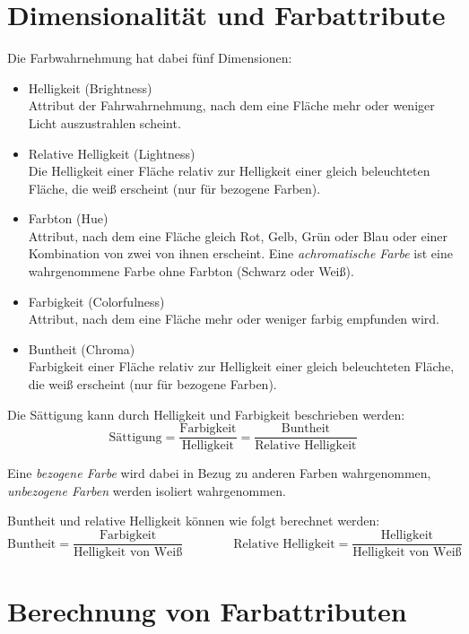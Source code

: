 	\section{Dimensionalität und Farbattribute}
		Die Farbwahrnehmung hat dabei fünf Dimensionen:
		\begin{itemize}
			\item Helligkeit (Brightness) \\ Attribut der Fahrwahrnehmung, nach dem eine Fläche mehr oder weniger Licht auszustrahlen scheint.
			\item Relative Helligkeit (Lightness) \\ Die Helligkeit einer Fläche relativ zur Helligkeit einer gleich beleuchteten Fläche, die weiß erscheint (nur für bezogene Farben).
			\item Farbton (Hue) \\ Attribut, nach dem eine Fläche gleich Rot, Gelb, Grün oder Blau oder einer Kombination von zwei von ihnen erscheint. Eine \emph{achromatische Farbe} ist eine wahrgenommene Farbe ohne Farbton (\zB Schwarz oder Weiß).
			\item Farbigkeit (Colorfulness) \\ Attribut, nach dem eine Fläche mehr oder weniger farbig empfunden wird.
			\item Buntheit (Chroma) \\ Farbigkeit einer Fläche relativ zur Helligkeit einer gleich beleuchteten Fläche, die weiß erscheint (nur für bezogene Farben).
		\end{itemize}
		Die Sättigung kann durch Helligkeit und Farbigkeit beschrieben werden:
		\begin{equation*}
			\text{Sättigung} = \frac{\text{Farbigkeit}}{\text{Helligkeit}} = \frac{\text{Buntheit}}{\text{Relative Helligkeit}}
		\end{equation*}
		
		Eine \emph{bezogene Farbe} wird dabei in Bezug zu anderen Farben wahrgenommen, \emph{unbezogene Farben} werden isoliert wahrgenommen.
		
		Buntheit und relative Helligkeit können wie folgt berechnet werden:
		\begin{equation*}
			\text{Buntheit} = \frac{\text{Farbigkeit}}{\text{Helligkeit von Weiß}} \quad\quad\quad\quad \text{Relative Helligkeit} = \frac{\text{Helligkeit}}{\text{Helligkeit von Weiß}}
		\end{equation*}

	\section{Berechnung von Farbattributen}
